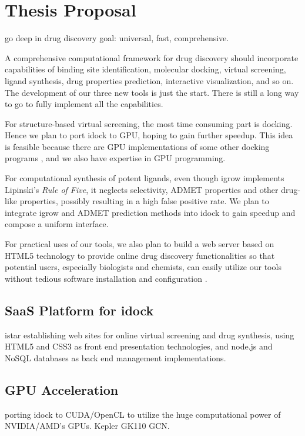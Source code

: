 \chapter{Thesis Proposal}

go deep in drug discovery
goal: universal, fast, comprehensive.

A comprehensive computational framework for drug discovery should incorporate capabilities of binding site identification, molecular docking, virtual screening, ligand synthesis, drug properties prediction, interactive visualization, and so on. The development of our three new tools is just the start. There is still a long way to go to fully implement all the capabilities.

For structure-based virtual screening, the most time consuming part is docking. Hence we plan to port idock to GPU, hoping to gain further speedup. This idea is feasible because there are GPU implementations of some other docking programs \citep{723,652,779}, and we also have expertise in GPU programming.

For computational synthesis of potent ligands, even though igrow implements Lipinski's \textit{Rule of Five}, it neglects selectivity, ADMET properties and other drug-like properties, possibly resulting in a high false positive rate. We plan to integrate igrow and ADMET prediction methods into idock to gain speedup and compose a uniform interface.

For practical uses of our tools, we also plan to build a web server based on HTML5 technology to provide online drug discovery functionalities so that potential users, especially biologists and chemists, can easily utilize our tools without tedious software installation and configuration \citep{677}.

\section{SaaS Platform for idock}

istar establishing web sites for online virtual screening and drug synthesis, using HTML5 and CSS3 as front end presentation technologies, and node.js and NoSQL databases as back end management implementations.

\section{GPU Acceleration}

porting idock to CUDA/OpenCL to utilize the huge computational power of NVIDIA/AMD's GPUs.
Kepler GK110
GCN.

